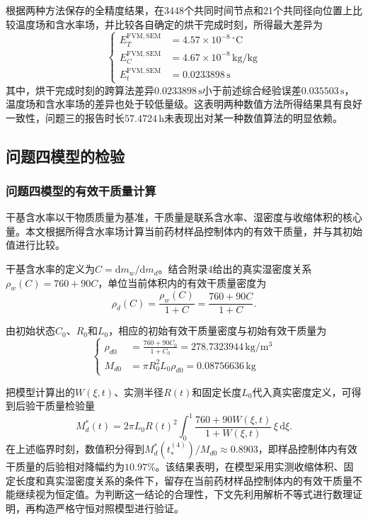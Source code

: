\documentclass[withoutpreface,bwprint]{cumcmthesis}
\begin{document}
根据两种方法保存的全精度结果，在3448个共同时间节点和21个共同径向位置上比较温度场和含水率场，并比较各自确定的烘干完成时刻，所得最大差异为
\begin{equation}
\left\{
\begin{aligned}
E_T^{\mathrm{FVM,SEM}}&=4.57\times10^{-8}\,{}^\circ\mathrm C\\
E_C^{\mathrm{FVM,SEM}}&=4.67\times10^{-8}\,\mathrm{kg/kg}\\
E_t^{\mathrm{FVM,SEM}}&=0.0233898\,\mathrm s
\end{aligned}
\right.
\label{eq:q3-cross-algorithm-differences}
\end{equation}
其中，烘干完成时刻的跨算法差异$0.0233898\,\mathrm s$小于前述综合经验误差$0.035503\,\mathrm s$，温度场和含水率场的差异也处于较低量级。这表明两种数值方法所得结果具有良好一致性，问题三的报告时长$57.4724\,\mathrm h$未表现出对某一种数值算法的明显依赖。



\subsection{问题四模型的检验}

\subsubsection{问题四模型的有效干质量计算}

干基含水率以干物质质量为基准，干质量是联系含水率、湿密度与收缩体积的核心量。本文根据所得含水率场计算当前药材样品控制体内的有效干质量，并与其初始值进行比较。

干基含水率的定义为$C=\mathrm dm_w/\mathrm dm_d$。结合附录4给出的真实湿密度关系$\rho_w(C)=760+90C$，单位当前体积内的有效干质量密度为
\begin{equation}
\boxed{
\rho_d(C)=\frac{\rho_w(C)}{1+C}
=\frac{760+90C}{1+C}.
}
\label{eq:q4-check-dry-density}
\end{equation}

由初始状态$C_0$、$R_0$和$L_0$，相应的初始有效干质量密度与初始有效干质量为
\begin{equation}
\left\{
\begin{aligned}
\rho_{d0}&=\frac{760+90C_0}{1+C_0}=278.7323944\,\mathrm{kg/m^3}\\
M_{d0}&=\pi R_0^2L_0\rho_{d0}=0.08756636\,\mathrm{kg}
\end{aligned}
\right.
\label{eq:q4-initial-dry-mass}
\end{equation}

把模型计算出的$W(\xi,t)$、实测半径$R(t)$和固定长度$L_0$代入真实密度定义，可得到后验干质量检验量
\begin{equation}
M_d^*(t)=2\pi L_0R(t)^2
\int_0^1\frac{760+90W(\xi,t)}{1+W(\xi,t)}\,\xi\,\mathrm d\xi.
\label{eq:q4-check-mass-proxy}
\end{equation}
在上述临界时刻，数值积分得到$M_d^*(t_*^{(4)})/M_{d0}\approx0.8903$，即样品控制体内有效干质量的后验相对降幅约为$10.97\%$。该结果表明，在模型采用实测收缩体积、固定长度和真实湿密度关系的条件下，留存在当前药材样品控制体内的有效干质量不能继续视为恒定值。为判断这一结论的合理性，下文先利用解析不等式进行数理证明，再构造严格守恒对照模型进行验证。
\end{document}
